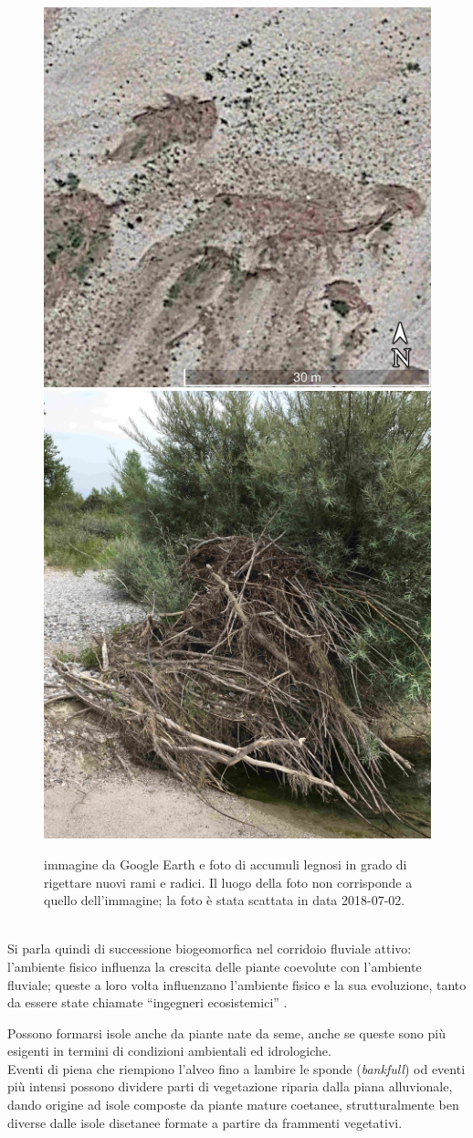 \begin{figure}
	\centering
	\includegraphics[width = .45\textwidth]{files/esempio_accumulo_sat_1.jpg}
	\quad
	\includegraphics[width = .45\textwidth]{files/esempio_accumulo_1.jpg}
	\caption[immagine e foto di accumuli legnosi]{immagine da Google Earth e foto di accumuli legnosi in grado di rigettare nuovi rami e radici. Il luogo della foto non corrisponde a quello dell'immagine; la foto è stata scattata in data 2018-07-02.}
	\label{fig:esempio-accumulo}
\end{figure}
%
\\
Si parla quindi di successione biogeomorfica nel corridoio fluviale attivo: l'ambiente fisico influenza la crescita delle piante coevolute con l'ambiente fluviale; queste a loro volta influenzano l'ambiente fisico e la sua evoluzione, tanto da essere state chiamate “ingegneri ecosistemici” .

Possono formarsi isole anche da piante nate da seme, anche se queste sono più esigenti in termini di condizioni ambientali ed idrologiche.
\\
Eventi di piena che riempiono l'alveo fino a lambire le sponde (\emph{bankfull}) od eventi più intensi possono dividere parti di vegetazione riparia dalla piana alluvionale, dando origine ad isole composte da piante mature coetanee, strutturalmente ben diverse dalle isole disetanee formate a partire da frammenti vegetativi.

